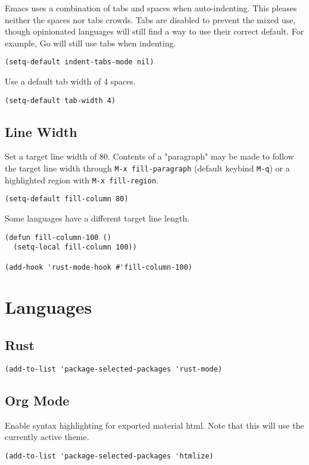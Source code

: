 \documentclass[11pt]{article}
\begin{document}
Emacs uses a combination of tabs and spaces when auto-indenting. This pleases
neither the spaces nor tabs crowds. Tabs are disabled to prevent the mixed use,
though opinionated languages will still find a way to use their correct
default. For example, Go will still use tabs when indenting.

\begin{verbatim}
(setq-default indent-tabs-mode nil)
\end{verbatim}

Use a default tab width of 4 spaces.

\begin{verbatim}
(setq-default tab-width 4)
\end{verbatim}
\subsection{Line Width}
\label{sec:org011b1db}

Set a target line width of 80. Contents of a "paragraph" may be made to follow
the target line width through \texttt{M-x fill-paragraph} (default keybind \texttt{M-q}) or a
highlighted region with \texttt{M-x fill-region}.

\begin{verbatim}
(setq-default fill-column 80)
\end{verbatim}

Some languages have a different target line length.

\begin{verbatim}
(defun fill-column-100 ()
  (setq-local fill-column 100))

(add-hook 'rust-mode-hook #'fill-column-100)
\end{verbatim}
\section{Languages}
\label{sec:org3405c2b}

\subsection{Rust}
\label{sec:org5dbea34}

\begin{verbatim}
(add-to-list 'package-selected-packages 'rust-mode)
\end{verbatim}
\subsection{Org Mode}
\label{sec:org60fff5f}

Enable syntax highlighting for exported material html. Note that this will use
the currently active theme.

\begin{verbatim}
(add-to-list 'package-selected-packages 'htmlize)
\end{verbatim}
\end{document}
